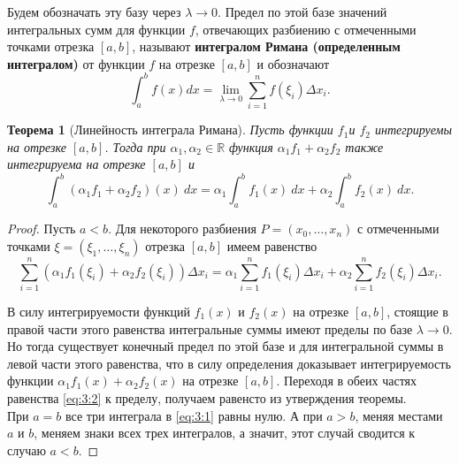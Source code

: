 \documentclass[12pt]{report}
\numberwithin{equation}{section}
\newtheorem{theorem}{Теорема}[section]
\begin{document}
Будем обозначать эту базу через $\lambda \to 0$. Предел по этой базе значений интегральных сумм для функции $f$, отвечающих разбиению с отмеченными точками отрезка $[a,b]$, называют \textbf{интегралом Римана (определенным интегралом)} от функции $f$ на отрезке $[a,b]$ и обозначают
\[ \int_{a}^b f(x) dx = \lim_{\lambda \to 0}\sum_{i=1}^n f(\xi_i) \Delta x_i.\]

\begin{theorem}[Линейность интеграла Римана] Пусть функции $f_1$и $f_2$ интегрируемы на отрезке $[a,b]$. Тогда при $\alpha_1, \alpha_2 \in \mathbb{R}$ функция $\alpha_1 f_1 + \alpha_2 f_2 $ также интегрируема на отрезке $[a,b]$ и 
\begin{equation}\label{eq:3:1}
\int_a^b (\alpha_1 f_1 + \alpha_2 f_2) (x) ~dx = \alpha_1 \int_a^b f_1(x) ~dx + \alpha_2 \int_a^b f_2(x)~dx. 
\end{equation}
\end{theorem}
\begin{proof} Пусть $a < b$. Для некоторого разбиения $P = (x_0, \ldots, x_n)$ с отмеченными точками $\xi = (\xi_1, \ldots, \xi_n)$ отрезка $[a,b]$ имеем равенство
\begin{equation}\label{eq:3:2}
\sum_{i=1}^n(\alpha_1f_1(\xi_i) + \alpha_2 f_2 (\xi_i))\Delta x_i = \alpha_1 \sum_{i=1}^n f_1 (\xi_i) \Delta x_i + \alpha_2 \sum_{i=1}^n f_2 (\xi_i) \Delta x_i.
\end{equation}

В силу интегрируемости функций $f_1(x)$ и $f_2(x)$ на отрезке $[a,b]$, стоящие в правой части этого равенства интегральные суммы имеют пределы по базе $\lambda \to 0$. Но тогда существует конечный предел по этой базе и для интегральной суммы в левой части этого равенства, что в силу определения доказывает интегрируемость функции $\alpha_1f_1(x) + \alpha_2 f_2(x)$ на отрезке $[a,b]$. Переходя в обеих частях равенства \eqref{eq:3:2} к пределу, получаем равенсто из утверждения теоремы.\\

При $a = b$ все три интеграла в \eqref{eq:3:1} равны нулю. А при $a > b$, меняя местами $a$ и $b$, меняем знаки всех трех интегралов, а значит, этот случай сводится к случаю $a < b$.
\end{proof}
\end{document}
